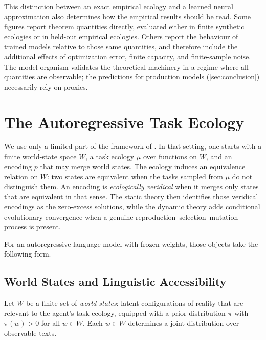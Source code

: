 \documentclass[twoside,11pt]{article}
\begin{document}
This distinction between an exact empirical ecology and a learned neural approximation also determines how the empirical results should be read. Some figures report theorem quantities directly, evaluated either in finite synthetic ecologies or in held-out empirical ecologies. Others report the behaviour of trained models relative to those same quantities, and therefore include the additional effects of optimization error, finite capacity, and finite-sample noise. The model organism validates the theoretical machinery in a regime where all quantities are observable; the predictions for production models (\cref{sec:conclusion}) necessarily rely on proxies.

\section{The Autoregressive Task Ecology}\label{sec:ecology}

We use only a limited part of the framework of \citet{dallariva_2026}. In
that setting, one starts with a finite world-state space $W$, a task
ecology $\mu$ over functions on $W$, and an encoding $p$ that may merge
world states. The ecology induces an equivalence relation on $W$: two
states are equivalent when the tasks sampled from $\mu$ do not
distinguish them. An encoding is \emph{ecologically veridical} when it
merges only states that are equivalent in that sense. The static theory
then identifies those veridical encodings as the zero-excess solutions,
while the dynamic theory adds conditional evolutionary convergence when
a genuine reproduction--selection--mutation process is present.

For an autoregressive language model with frozen weights, those objects
take the following form.

\subsection{World States and Linguistic Accessibility}

\begin{definition}
Let $W$ be a finite set of \emph{world states}: latent configurations of reality that are relevant to the agent's task ecology, equipped with a prior distribution $\pi$ with $\pi(w) > 0$ for all $w \in W$. Each $w \in W$ determines a joint distribution over observable texts.
\end{definition}
\end{document}
